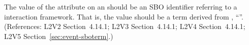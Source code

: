 The value of the  attribute on an \Event should be
an SBO identifier referring to a interaction framework.  That is, the
value should be a term derived from \sbointeractionID,
``''.  (References: L2V2 Section~4.14.1; L2V3
Section~4.14.1; L2V4 Section~4.14.1; L2V5 Section~\ref{sec:event-sboterm}.)
